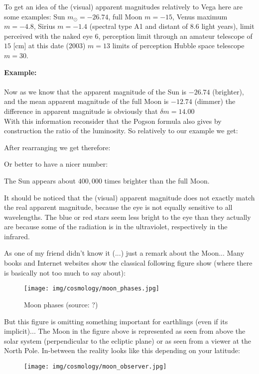 	To get an idea of the (visual) apparent magnitudes relatively to Vega here are some examples: Sun $m_{\odot}=-26.74$, full Moon $m=-15$, Venus maximum $m=-4.8$, Sirius $m=-1.4$ (spectral type A1 and distant of $8.6$ light years), limit perceived with the naked eye $6$, perception limit through an amateur telescope of $15$ [cm] at this date (2003) $m=13$ limits of perception Hubble space telescope $m=30$.
	\begin{tcolorbox}[colframe=black,colback=white,sharp corners]
	\textbf{{\Large {}}Example:}\\\\
	Now as we know that the apparent magnitude of the Sun is $-26.74$ (brighter), and the mean apparent magnitude of the full Moon is $-12.74$ (dimmer) the difference in apparent magnitude is obviously that $\delta m=14.00$\\

	With this information reconsider that the Pogson formula also gives by construction the ratio of the luminosity. So relatively to our example we get:
	
	After rearranging we get therefore:
	
	Or better to have a nicer number:
	
	The Sun appears about $400,000$ times brighter than the full Moon.
	\end{tcolorbox}
	It should be noticed that the (visual) apparent magnitude does not exactly match the real apparent magnitude, because the eye is not equally sensitive to all wavelengths. The blue or red stars seem less bright to the eye than they actually are because some of the radiation is in the ultraviolet, respectively in the infrared.
	
	As one of my friend didn't know it (...) just a remark about the Moon... Many books and Internet websites show the classical following figure show (where there is basically not too much to say about):
	\begin{figure}[H]
		\centering
		\texttt{[image: img/cosmology/moon\_phases.jpg]}
		\caption[Moon phases]{Moon phases (source: ?)}
	\end{figure}
	But this figure is omitting something important for earthlings (even if its implicit)... The Moon in the figure above is represented as seen from above the solar system (perpendicular to the ecliptic plane) or as seen from a viewer at the North Pole. In-between the reality looks like this depending on your latitude:
	\begin{figure}[H]
		\centering
		\texttt{[image: img/cosmology/moon\_observer.jpg]}
	\end{figure}

